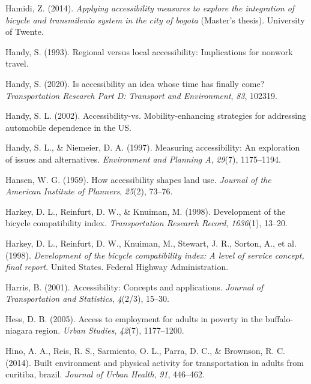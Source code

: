 \documentclass[
11pt, %
oneside, %
english, %
singlespacing, %
]{macthesis} %
\newlength{\cslhangindent}
\newenvironment{CSLReferences}[2] %
 {%
  \setlength{\parindent}{0pt}
  \ifodd #1 \everypar{\setlength{\hangindent}{\cslhangindent}}\ignorespaces\fi
  \ifnum #2 > 0
  \setlength{\parskip}{#2\baselineskip}
  \fi
 }%
 {}
\begin{document}
\begin{CSLReferences}{1}{0}
\leavevmode{}%
Hamidi, Z. (2014). \emph{Applying accessibility measures to explore the integration of bicycle and transmilenio system in the city of bogota} (Master's thesis). University of Twente.

\leavevmode{}%
Handy, S. (1993). Regional versus local accessibility: Implications for nonwork travel.

\leavevmode{}%
Handy, S. (2020). Is accessibility an idea whose time has finally come? \emph{Transportation Research Part D: Transport and Environment}, \emph{83}, 102319.

\leavevmode{}%
Handy, S. L. (2002). Accessibility-vs. Mobility-enhancing strategies for addressing automobile dependence in the US.

\leavevmode{}%
Handy, S. L., \& Niemeier, D. A. (1997). Measuring accessibility: An exploration of issues and alternatives. \emph{Environment and Planning A}, \emph{29}(7), 1175--1194.

\leavevmode{}%
Hansen, W. G. (1959). How accessibility shapes land use. \emph{Journal of the American Institute of Planners}, \emph{25}(2), 73--76.

\leavevmode{}%
Harkey, D. L., Reinfurt, D. W., \& Knuiman, M. (1998). Development of the bicycle compatibility index. \emph{Transportation Research Record}, \emph{1636}(1), 13--20.

\leavevmode{}%
Harkey, D. L., Reinfurt, D. W., Knuiman, M., Stewart, J. R., Sorton, A., et al. (1998). \emph{Development of the bicycle compatibility index: A level of service concept, final report}. United States. Federal Highway Administration.

\leavevmode{}%
Harris, B. (2001). Accessibility: Concepts and applications. \emph{Journal of Transportation and Statistics}, \emph{4}(2/3), 15--30.

\leavevmode{}%
Hess, D. B. (2005). Access to employment for adults in poverty in the buffalo-niagara region. \emph{Urban Studies}, \emph{42}(7), 1177--1200.

\leavevmode{}%
Hino, A. A., Reis, R. S., Sarmiento, O. L., Parra, D. C., \& Brownson, R. C. (2014). Built environment and physical activity for transportation in adults from curitiba, brazil. \emph{Journal of Urban Health}, \emph{91}, 446--462.


\end{CSLReferences}
\end{document}
